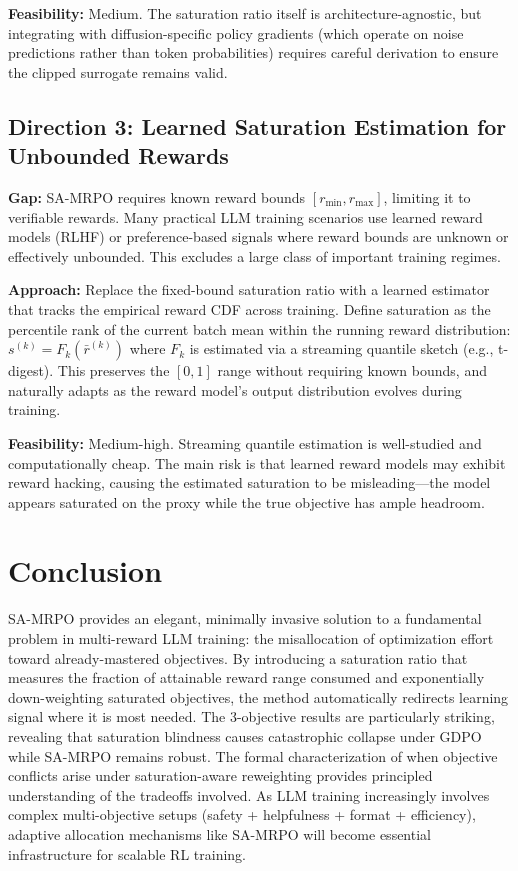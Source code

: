 \documentclass[11pt,a4paper]{article}
\begin{document}
\textbf{Feasibility:} Medium. The saturation ratio itself is architecture-agnostic, but integrating with diffusion-specific policy gradients (which operate on noise predictions rather than token probabilities) requires careful derivation to ensure the clipped surrogate remains valid.

\subsection{Direction 3: Learned Saturation Estimation for Unbounded Rewards}
\textbf{Gap:} SA-MRPO requires known reward bounds $[r_{\min}, r_{\max}]$, limiting it to verifiable rewards. Many practical LLM training scenarios use learned reward models (RLHF) or preference-based signals where reward bounds are unknown or effectively unbounded. This excludes a large class of important training regimes.

\textbf{Approach:} Replace the fixed-bound saturation ratio with a learned estimator that tracks the empirical reward CDF across training. Define saturation as the percentile rank of the current batch mean within the running reward distribution: $s^{(k)} = F_k(\bar{r}^{(k)})$ where $F_k$ is estimated via a streaming quantile sketch (e.g., t-digest). This preserves the $[0,1]$ range without requiring known bounds, and naturally adapts as the reward model's output distribution evolves during training.

\textbf{Feasibility:} Medium-high. Streaming quantile estimation is well-studied and computationally cheap. The main risk is that learned reward models may exhibit reward hacking, causing the estimated saturation to be misleading---the model appears saturated on the proxy while the true objective has ample headroom.

\section{Conclusion}
SA-MRPO provides an elegant, minimally invasive solution to a fundamental problem in multi-reward LLM training: the misallocation of optimization effort toward already-mastered objectives. By introducing a saturation ratio that measures the fraction of attainable reward range consumed and exponentially down-weighting saturated objectives, the method automatically redirects learning signal where it is most needed. The 3-objective results are particularly striking, revealing that saturation blindness causes catastrophic collapse under GDPO while SA-MRPO remains robust. The formal characterization of when objective conflicts arise under saturation-aware reweighting provides principled understanding of the tradeoffs involved. As LLM training increasingly involves complex multi-objective setups (safety + helpfulness + format + efficiency), adaptive allocation mechanisms like SA-MRPO will become essential infrastructure for scalable RL training.
\end{document}
